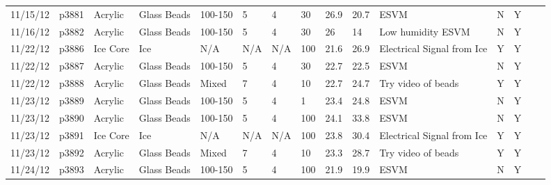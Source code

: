 \begin{landscape}
\begin{longtable}{lllllllllllllll}
11/15/12 & p3881      & Acrylic          & Glass Beads  & 100-150      & 5         & 4             & 30                           & 26.9        & 20.7     & ESVM                                            & N     & Y    &  &  \\
11/16/12 & p3882      & Acrylic          & Glass Beads  & 100-150      & 5         & 4             & 30                           & 26          & 14       & Low humidity ESVM                               & N     & Y    &  &  \\
11/22/12 & p3886      & Ice Core         & Ice          & N/A          & N/A       & N/A           & 100                          & 21.6        & 26.9     & Electrical Signal from Ice                      & Y     & Y    &  &  \\
11/22/12 & p3887      & Acrylic          & Glass Beads  & 100-150      & 5         & 4             & 30                           & 22.7        & 22.5     & ESVM                                            & N     & Y    &  &  \\
11/22/12 & p3888      & Acrylic          & Glass Beads  & Mixed        & 7         & 4             & 10                           & 22.7        & 24.7     & Try video of beads                              & Y     & Y    &  &  \\
11/23/12 & p3889      & Acrylic          & Glass Beads  & 100-150      & 5         & 4             & 1                            & 23.4        & 24.8     & ESVM                                            & N     & Y    &  &  \\
11/23/12 & p3890      & Acrylic          & Glass Beads  & 100-150      & 5         & 4             & 100                          & 24.1        & 33.8     & ESVM                                            & N     & Y    &  &  \\
11/23/12 & p3891      & Ice Core         & Ice          & N/A          & N/A       & N/A           & 100                          & 23.8        & 30.4     & Electrical Signal from Ice                      & Y     & Y    &  &  \\
11/23/12 & p3892      & Acrylic          & Glass Beads  & Mixed        & 7         & 4             & 10                           & 23.3        & 28.7     & Try video of beads                              & Y     & Y    &  &  \\
11/24/12 & p3893      & Acrylic          & Glass Beads  & 100-150      & 5         & 4             & 100                          & 21.9        & 19.9     & ESVM                                            & N     & Y    &  &  \\

\end{longtable}
\end{landscape}
